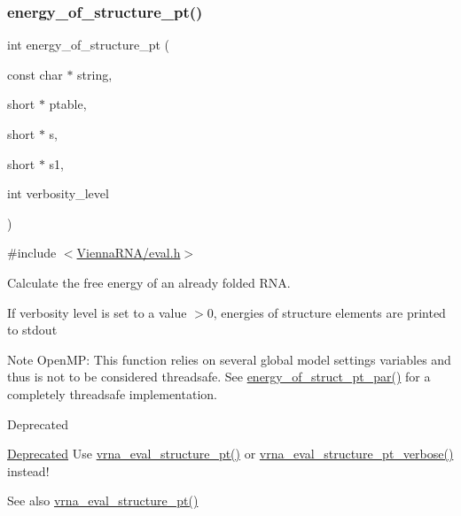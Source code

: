 \subsubsection{\texorpdfstring{energy\+\_\+of\+\_\+structure\+\_\+pt()}{energy\_of\_structure\_pt()}}
{\footnotesize\ttfamily int energy\+\_\+of\+\_\+structure\+\_\+pt (\begin{DoxyParamCaption}\item[{const char $\ast$}]{string,  }\item[{short $\ast$}]{ptable,  }\item[{short $\ast$}]{s,  }\item[{short $\ast$}]{s1,  }\item[{int}]{verbosity\+\_\+level }\end{DoxyParamCaption})}



{\ttfamily \#include $<$\hyperlink{eval_8h}{Vienna\+R\+N\+A/eval.\+h}$>$}



Calculate the free energy of an already folded R\+NA. 

If verbosity level is set to a value $>$0, energies of structure elements are printed to stdout

\begin{DoxyNote}{Note}
Open\+MP\+: This function relies on several global model settings variables and thus is not to be considered threadsafe. See \hyperlink{group__eval_ga49acb3d5627dc6823a7ce12d116d4c69}{energy\+\_\+of\+\_\+struct\+\_\+pt\+\_\+par()} for a completely threadsafe implementation.
\end{DoxyNote}
\begin{DoxyRefDesc}{Deprecated}
\item[\hyperlink{deprecated__deprecated000055}{Deprecated}]Use \hyperlink{group__eval_gadbd09372ddfd7a450bbd590c96a6bfe4}{vrna\+\_\+eval\+\_\+structure\+\_\+pt()} or \hyperlink{group__eval_ga8a517cfeeae8c376ae7b1e0c401d38b4}{vrna\+\_\+eval\+\_\+structure\+\_\+pt\+\_\+verbose()} instead!\end{DoxyRefDesc}


\begin{DoxySeeAlso}{See also}
\hyperlink{group__eval_gadbd09372ddfd7a450bbd590c96a6bfe4}{vrna\+\_\+eval\+\_\+structure\+\_\+pt()}
\end{DoxySeeAlso}

